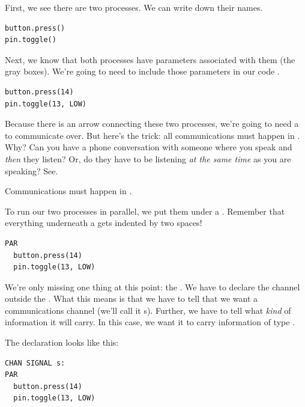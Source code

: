 First, we see there are two {\strong processes}. We can write down their names.

\vspace{3mm}
\begin{lstlisting}
button.press()
pin.toggle()
\end{lstlisting}

Next, we know that both processes have {\strong parameters} associated with them (the gray boxes). We're going to need to include those parameters in our code%
.

\vspace{3mm}
\begin{lstlisting}
button.press(14)
pin.toggle(13, LOW)
\end{lstlisting}

Because there is an arrow connecting these two processes, we're going to need a \CHANnel to communicate over. But here's the trick: {\strong all communications must happen in \PARallel}. Why? Can you have a phone conversation with someone where you speak and {\em then} they listen? Or, do they have to be listening {\em at the same time} as you are speaking? See. 

{\strong Communications must happen in \PARallel.}

\newpage

To run our two processes in parallel, we put them under a \PAR. Remember that everything underneath a \PAR gets indented by two spaces!

\vspace{3mm}
\begin{lstlisting}
PAR
  button.press(14)
  pin.toggle(13, LOW)
\end{lstlisting}

We're only missing one thing at this point: the \CHANnel. We have to {\strong declare} the channel outside the \PAR. What this means is that we have to tell \occam that we want a communications channel (we'll call it {\code s}). Further, we have to tell \occam what {\em kind} of information it will carry. In this case, we want it to carry information of type \SIGNALT. 

The declaration looks like this:

\vspace{3mm}
\begin{lstlisting}
CHAN SIGNAL s:
PAR
  button.press(14)
  pin.toggle(13, LOW)
\end{lstlisting}

